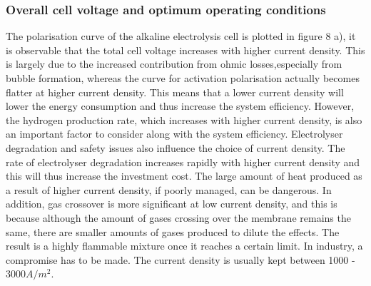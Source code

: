\subsubsection{Overall cell voltage and optimum operating conditions}
The polarisation curve of the alkaline electrolysis cell is plotted in figure 8 a), it is observable that the total cell voltage increases with higher current density. This is largely due to the increased contribution from ohmic losses,especially from bubble formation, whereas the curve for activation polarisation actually becomes flatter at higher current density. This means that a lower current density will lower the energy consumption and thus increase the system efficiency. However, the hydrogen production rate, which increases with higher current density,  is also an important factor to consider along with the system efficiency.  Electrolyser degradation and safety issues also influence the choice of current density. The rate of electrolyser degradation increases rapidly with higher current density and this will thus increase the investment cost. The large amount of heat produced as a result of higher current density, if poorly managed, can be dangerous. In addition, gas crossover is more significant at low current density, and this is because although the amount of gases crossing over the membrane remains the same, there are smaller amounts of gases produced to dilute the effects. The result is a highly flammable mixture once it reaches a certain limit. In industry, a compromise has to be made. The current density is usually kept between 1000 - 3000$A/m^2$. \cite{currentdensity}\cite{currentdensity2}

